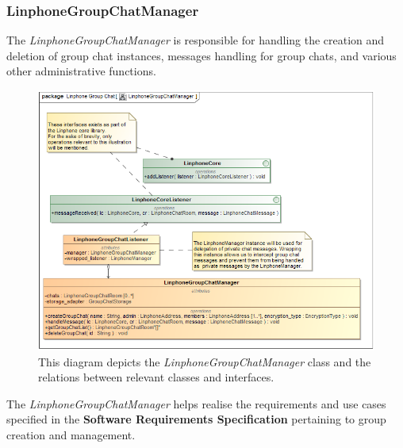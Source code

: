 \documentclass[11pt]{article}
\begin{document}
\subsubsection{LinphoneGroupChatManager}
The \textit{LinphoneGroupChatManager} is responsible for handling the creation and deletion of group chat instances, messages handling for group chats, and various other administrative functions.
\begin{figure}[H]
	\centering
	\includegraphics[width=5in]{./images/class_chat_manager.png}
	\caption[LinphoneGroupChatManager Class Diagram]{This diagram depicts the \textit{LinphoneGroupChatManager} class and the relations between relevant classes and interfaces.}
	\label{cd-chat-manager}
\end{figure}
The \textit{LinphoneGroupChatManager} helps realise the requirements and use cases specified in the \textbf{Software Requirements Specification} pertaining to group creation and management.
\end{document}
